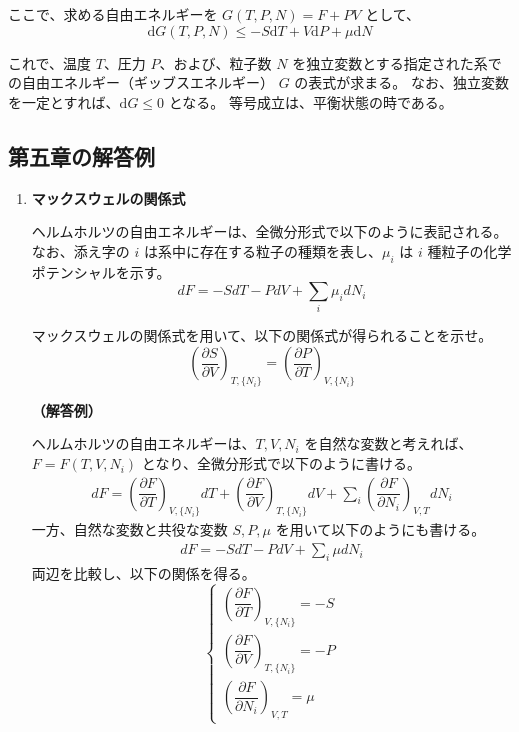 \documentclass[uplatex,dvipdfmx,a4paper,11pt]{jsarticle}
\newcommand{\diff}{\mathrm d}
\begin{document}
\begin{appendix}
\begin{enumerate}
\begin{enumerate}
ここで、求める自由エネルギーを $G(T,P,N) = F + PV$ として、
\begin{equation*}
\diff G(T,P,N) \leq -S \diff T + V \diff P + \mu \diff N
\end{equation*}
	 	
これで、温度 $T$、圧力 $P$、および、粒子数 $N$ を独立変数とする指定された系での自由エネルギー（ギッブスエネルギー） $G$ の表式が求まる。
なお、独立変数を一定とすれば、$\diff G \leq 0$ となる。
等号成立は、平衡状態の時である。

\end{enumerate}

\end{enumerate}

\newpage

\subsection{第五章の解答例}

\begin{enumerate}

\item
{\bf マックスウェルの関係式}

ヘルムホルツの自由エネルギーは、全微分形式で以下のように表記される。
なお、添え字の $i$ は系中に存在する粒子の種類を表し、$\mu_i$ は $i$ 種粒子の化学ポテンシャルを示す。
\begin{equation*}
dF = -S dT -P dV + \sum_i \mu_i d N_i
\end{equation*}

マックスウェルの関係式を用いて、以下の関係式が得られることを示せ。
\begin{equation*}
\left(\dfrac{\partial S}{\partial V} \right)_{T, \{N_i\}} = \left(\dfrac{\partial P}{\partial T} \right)_{V, \{N_i\}}
\end{equation*}

{\bf （解答例）}

ヘルムホルツの自由エネルギーは、$T, V, N_i$ を自然な変数と考えれば、$F = F(T, V, N_i)$ となり、全微分形式で以下のように書ける。
\begin{align*}
dF = \left(\dfrac{\partial F}{\partial T} \right)_{V, \{N_i\}} dT + \left(\dfrac{\partial F}{\partial V} \right)_{T, \{N_i\}} dV + \sum_i \left(\dfrac{\partial F}{\partial N_i} \right)_{V, T} d N_i 
\end{align*}
一方、自然な変数と共役な変数 $S, P, \mu$ を用いて以下のようにも書ける。
\begin{align*}
dF = -S dT -P dV + \sum_i \mu d N_i
\end{align*}
両辺を比較し、以下の関係を得る。
\begin{equation*}
\begin{cases}
\left(\dfrac{\partial F}{\partial T} \right)_{V, \{N_i\}} = -S \\[10pt]
\left(\dfrac{\partial F}{\partial V} \right)_{T, \{N_i\}} = -P \\[10pt]
\left(\dfrac{\partial F}{\partial N_i} \right)_{V, T} =\mu
\end{cases}
\end{equation*}


\end{enumerate}
\end{appendix}
\end{document}
